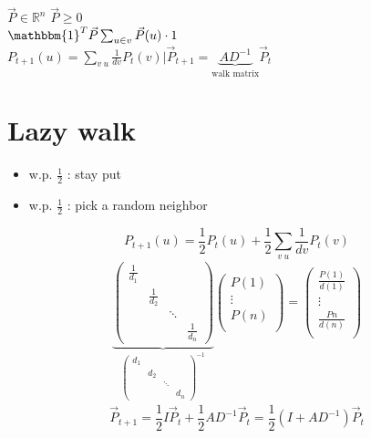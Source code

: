 \documentclass[12pt]{article}
\begin{document}
$\vec{P} \in \mathbb{R}^n$ $\vec{P} \geq 0$\\

$\mathbbm{1}^T \vec{P} \sum_{u \in v} \vec{P}(u)\cdot 1$\\

$P_{t+1}(u) = \sum_{v~u} \frac{1}{dv}P_t(v)|\vec{P}_{t+1}=\underbrace{AD^{-1}}_{\text{walk matrix}}\vec{P}_t$

\section{Lazy walk}
\begin{itemize}
	\item w.p. $\frac{1}{2}$ : stay put
	\item w.p. $\frac{1}{2}$ : pick a random neighbor
\end{itemize}
$$P_{t+1} (u) = \frac{1}{2}P_t(u)+\frac{1}{2}\sum_{v~u}\frac{1}{dv}P_t(v)$$
\begin{eqnarray*}
 \underbrace{ \left(\begin{matrix}
  	\frac{1}{d_1} &  & &\\
  	&\frac{1}{d_2}  & &\\
  	& &\ddots &\\
  	&&&\frac{1}{d_n}
  \end{matrix}\right)}_{\left(\begin{matrix}
  {d_1} &  & &\\
  &{d_2}  & &\\
  & &\ddots &\\
  &&&{d_n}
\end{matrix}\right)^{-1}}
	\left(\begin{matrix}
		P(1)\\
		\vdots\\
		P(n)\\
	\end{matrix}\right)
	=\left(\begin{matrix}
		\frac{P(1)}{d(1)}\\
		\vdots\\
		\frac{Pn}{d(n)}\\
	\end{matrix}\right)
\end{eqnarray*}
$$\vec{P}_{t+1} = \frac{1}{2}I\vec{P}_t + \frac{1}{2}AD^{-1}\vec{P}_t=\frac{1}{2}(I+AD^{-1})\vec{P}_t$$
\end{document}
